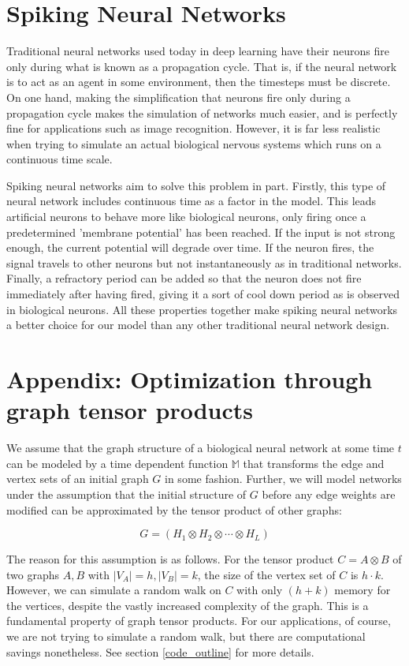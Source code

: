 \documentclass{article}
\newcommand{\tensProd}{\otimes}
\newcommand{\M}{\mathbb{M}}
\begin{document}
\section{Spiking Neural Networks}
Traditional neural networks used today in deep learning have their neurons fire only during what is known as a propagation cycle. That is, if the neural network is to act as an agent in some environment, then the timesteps must be discrete. On one hand, making the simplification that neurons fire only during a propagation cycle makes the simulation of networks much easier, and is perfectly fine for applications such as image recognition. However, it is far less realistic when trying to simulate an actual biological nervous systems which runs on a continuous time scale.

Spiking neural networks aim to solve this problem in part. Firstly, this type of neural network includes continuous time as a factor in the model. This leads artificial neurons to behave more like biological neurons, only firing once a predetermined 'membrane potential' has been reached. If the input is not strong enough, the current potential will degrade over time. If the neuron fires, the signal travels to other neurons but not instantaneously as in traditional networks. Finally, a refractory period can be added so that the neuron does not fire immediately after having fired, giving it a sort of cool down period as is observed in biological neurons. All these properties together make spiking neural networks a better choice for our model than any other traditional neural network design.

\section{Appendix: Optimization through graph tensor products}

We assume that the graph structure of a biological neural network at some time $t$ can be modeled by a time dependent function $\M$ that transforms the edge and vertex sets of an initial graph $G$ in some fashion. Further, we will model networks under the assumption that the initial structure of $G$ before any edge weights are modified can be approximated by the tensor product of other graphs:

$$ G = (H_1 \tensProd H_2 \tensProd \cdots \tensProd H_L ) $$

The reason for this assumption is as follows. For the tensor product $ C = A \otimes B$ of two graphs $A,B$ with $|V_A| = h, |V_B| = k$, the size of the vertex set of $C$ is $h \cdot k$. However, we can simulate a random walk on $C$ with only $(h + k)$ memory for the vertices, despite the vastly increased complexity of the graph. This is a fundamental property of graph tensor products. For our applications, of course, we are not trying to simulate a random walk, but there are computational savings nonetheless. See section \ref{code_outline} for more details.
\end{document}
